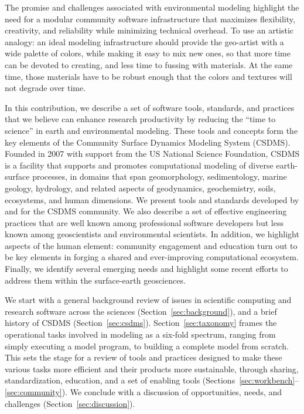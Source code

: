 \documentclass[12pt]{amsart}
\begin{document}
The promise and challenges associated with environmental modeling highlight the need for a modular community software infrastructure that maximizes flexibility, creativity, and reliability while minimizing technical overhead. To use an artistic analogy: an ideal modeling infrastructure should provide the geo-artist with a wide palette of colors, while making it easy to mix new ones, so that more time can be devoted to creating, and less time to fussing with materials. At the same time, those materials have to be robust enough that the colors and textures will not degrade over time.

In this contribution, we describe a set of software tools, standards, and practices that we believe can enhance research productivity by reducing the ``time to science'' in earth and environmental modeling. These tools and concepts form the key elements of the Community Surface Dynamics Modeling System (CSDMS). Founded in 2007 with support from the US National Science Foundation, CSDMS is a facility that supports and promotes computational modeling of diverse earth-surface processes, in domains that span geomorphology, sedimentology, marine geology, hydrology, and related aspects of geodynamics, geochemistry, soils, ecosystems, and human dimensions. We present tools and standards developed by and for the CSDMS community. We also describe a set of effective engineering practices that are well known among professional software developers but less known among geoscientists and environmental scientists. In addition, we highlight aspects of the human element: community engagement and education turn out to be key elements in forging a shared and ever-improving computational ecosystem. Finally, we identify several emerging needs and highlight some recent efforts to address them within the surface-earth geosciences.

We start with a general background review of issues in scientific computing and research software across the sciences (Section~\ref{sec:background}), and a brief history of CSDMS (Section~\ref{sec:csdms}). Section~\ref{sec:taxonomy} frames the operational tasks involved in modeling as a six-fold spectrum, ranging from simply executing a model program, to building a complete model from scratch. This sets the stage for a review of tools and practices designed to make these various tasks more efficient and their products more sustainable, through sharing, standardization, education, and a set of enabling tools (Sections~\ref{sec:workbench}--\ref{sec:community}). We conclude with a discussion of opportunities, needs, and challenges (Section~\ref{sec:discussion}).
\end{document}
